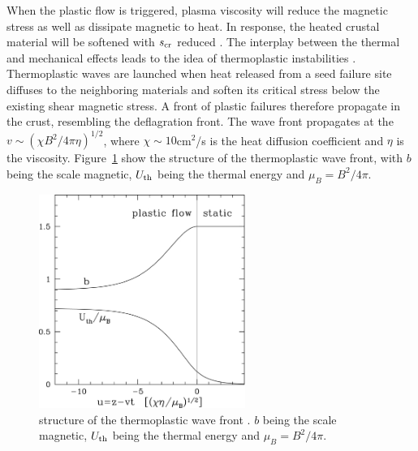 When the plastic flow is triggered, plasma viscosity will reduce the magnetic stress as well as dissipate magnetic to heat.
In response, the heated crustal material will be softened with $s_{\rm cr}$ reduced \citep{2010MNRAS.407L..54C}.
The interplay between the thermal and mechanical effects leads to the idea of thermoplastic instabilities \citep{2014ApJ...794L..24B}.
Thermoplastic waves are launched when heat released from a seed failure site diffuses to the neighboring materials and soften its critical stress below the existing shear magnetic stress.
A front of plastic failures therefore propagate in the crust, resembling the deflagration front.
The wave front propagates at the $v\sim (\chi B^2/4\pi\eta)^{1/2}$, where $\chi \sim 10$cm$^2$/s is the heat diffusion coefficient and $\eta$ is the viscosity.
Figure~\ref{fig:tpw} show the structure of the thermoplastic wave front, with $b$ being the scale magnetic, $U_{\rm th}$ being the thermal energy and $\mu_B=B^2/4\pi$.
%
\begin{figure}[h]
  \centering
  \includegraphics[width=0.6\textwidth]{pics/intro/tpw.jpg}
  \caption[Structure of the thermoplastic wave front]{structure of the thermoplastic wave front \citep{2014ApJ...794L..24B}.
  $b$ being the scale magnetic, $U_{\rm th}$ being the thermal energy and $\mu_B=B^2/4\pi$.}
  \label{fig:tpw}
\end{figure}
%

